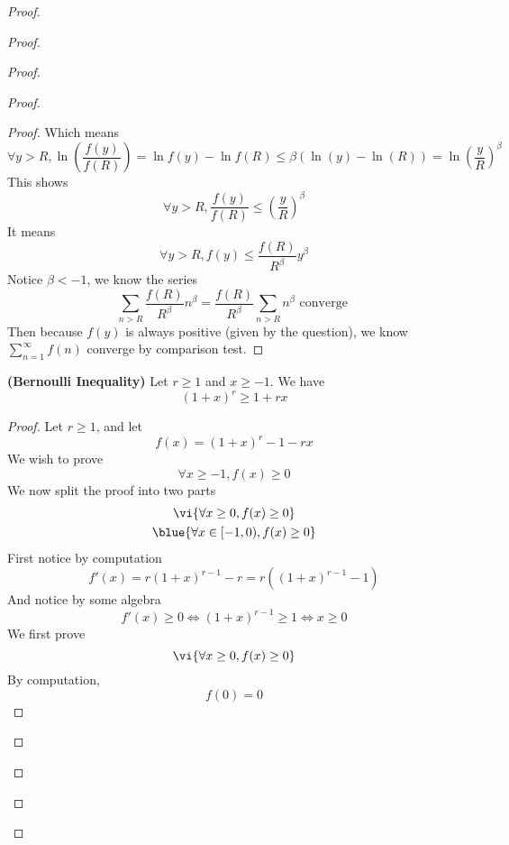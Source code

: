 \documentclass{report}
\begin{document}
\begin{proof}
\begin{proof}
\begin{proof}
\begin{proof}
\begin{proof}
Which means
\begin{equation*}
\forall y>R,\ln ( \frac{f(y)}{f(R)})=\ln f(y)-\ln f(R)\leq \beta (\ln(y)-\ln(R))= \ln(\frac{y}{R})^\beta 
\end{equation*}
This shows
\begin{equation*}
\forall y>R, \frac{f(y)}{f(R)}\leq (\frac{y}{R})^{\beta }
\end{equation*}
It means
\begin{equation*}
\forall y>R, f(y)\leq \frac{f(R)}{R^{\beta }}y^{\beta }
\end{equation*}
Notice $\beta <-1$, we know the series 
\begin{equation*}
\sum_{n>R} \frac{f(R)}{R^{\beta }}n^{\beta }=\frac{f(R)}{R^{\beta }}\sum_{n>R}n^{\beta }\text{ converge }
\end{equation*}
Then because $f(y)$ is always positive (given by the question), we know $\sum_{n=1}^\infty f(n)$ converge by comparison test.
\end{proof}
\begin{lemma}
\label{8.3.4}
\textbf{(Bernoulli Inequality)} Let  $r\geq 1$ and $x\geq -1$. We have
\begin{equation*}
  (1+x)^r\geq 1+rx
\end{equation*}
\end{lemma}
\begin{proof}
Let $r\geq 1$, and let
\begin{equation*}
f(x)=(1+x)^r-1-rx
\end{equation*}
We wish to prove 
\begin{equation*}
\forall x\geq -1, f(x)\geq 0
\end{equation*}
We now split the proof into two parts
\begin{gather*}
  \vi{\forall x\geq 0, f(x)\geq 0}\\
  \blue{\forall x\in [-1,0), f(x)\geq 0}
\end{gather*}
First notice by computation
\begin{equation*}
f'(x)=r(1+x)^{r-1}-r=r((1+x)^{r-1}-1)
\end{equation*}
And notice by some algebra
\begin{equation*}
f'(x)\geq 0\iff  (1+x)^{r-1}\geq 1\iff  x\geq 0
\end{equation*}
We first prove 
\begin{equation*}
\vi{\forall x\geq 0, f(x)\geq 0}
\end{equation*}
By computation,
\begin{equation*}
f(0)=0

\end{equation*}
\end{proof}
\end{proof}
\end{proof}
\end{proof}
\end{proof}
\end{document}

